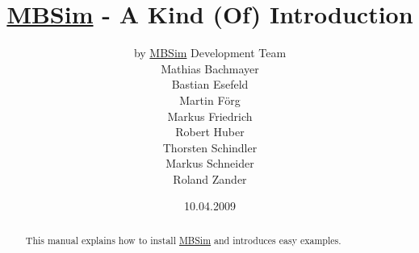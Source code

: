 \documentclass[a4,english]{AMpaper}
\newcommand{\MBSim}{\href{http://mbsim.berlios.de}{\textsf{MBSim}}}
\begin{document}
\title{\MBSim{} - A Kind (Of) Introduction}
\author{by \MBSim{} Development Team\\
  Mathias Bachmayer\\
  Bastian Esefeld\\
  Martin F\"org\\
  Markus Friedrich\\
  Robert Huber\\
  Thorsten Schindler\\
  Markus Schneider\\
  Roland Zander}
\date{10.04.2009}
\maketitle

\begin{abstract}
  This manual explains how to install \MBSim{} and introduces easy examples.
\end{abstract}

\noindent\hrulefill
\tableofcontents





%
\appendix





\end{document}
